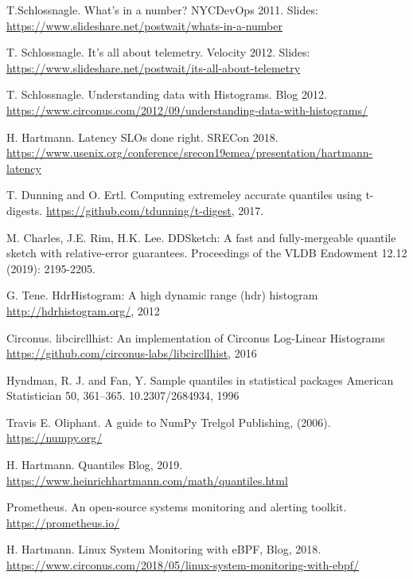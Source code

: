 \documentclass{article}
\theoremstyle{plain}
\theoremstyle{remark}
\begin{document}

\begin{thebibliography}{1}

  T.Schlossnagle.
  \newblock What's in a number?
  \newblock NYCDevOps 2011. Slides: \url{https://www.slideshare.net/postwait/whats-in-a-number}

  T. Schlossnagle.
  \newblock It's all about telemetry.
  \newblock Velocity 2012. Slides: \url{https://www.slideshare.net/postwait/its-all-about-telemetry}

  T. Schlossnagle.
  \newblock Understanding data with Histograms.
  \newblock Blog 2012. \url{https://www.circonus.com/2012/09/understanding-data-with-histograms/}

  H. Hartmann.
  \newblock Latency SLOs done right.
  \newblock SRECon 2018. \url{https://www.usenix.org/conference/srecon19emea/presentation/hartmann-latency}

  T. Dunning and O. Ertl.
  \newblock  Computing extremeley accurate quantiles using t-digests.
  \newblock \url{https://github.com/tdunning/t-digest}, 2017.

  M. Charles, J.E. Rim, H.K. Lee.
  \newblock DDSketch: A fast and fully-mergeable quantile sketch with relative-error guarantees.
  \newblock Proceedings of the VLDB Endowment 12.12 (2019): 2195-2205.

  G. Tene.
  \newblock HdrHistogram: A high dynamic range (hdr) histogram
  \newblock \url{http://hdrhistogram.org/}, 2012

  Circonus.
  \newblock libcircllhist: An implementation of Circonus Log-Linear Histograms
  \newblock \url{https://github.com/circonus-labs/libcircllhist}, 2016

  Hyndman, R. J. and Fan, Y.
  \newblock Sample quantiles in statistical packages
  \newblock American Statistician 50, 361–365. 10.2307/2684934, 1996

  Travis E. Oliphant.
  \newblock A guide to NumPy
  \newblock Trelgol Publishing, (2006). \url{https://numpy.org/}

  H. Hartmann.
  \newblock Quantiles
  \newblock Blog, 2019. \url{https://www.heinrichhartmann.com/math/quantiles.html}

  Prometheus.
  \newblock An open-source systems monitoring and alerting toolkit.
  \newblock \url{https://prometheus.io/}

  H. Hartmann.
  \newblock Linux System Monitoring with eBPF,
  \newblock Blog, 2018. \url{https://www.circonus.com/2018/05/linux-system-monitoring-with-ebpf/}
  
\end{thebibliography}
\end{document}
